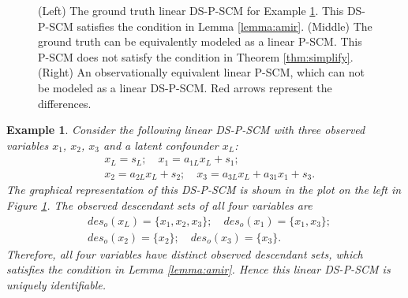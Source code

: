 \documentclass[12pt]{article}
\newtheorem{example}{Example}
\begin{document}
\begin{figure}[t]
\begin{tikzpicture}[thick, scale=.37]
\end{tikzpicture}
\caption{(Left) The ground truth linear DS-P-SCM for Example \ref{example_amir}. This DS-P-SCM satisfies the condition in Lemma \ref{lemma:amir}. (Middle) The ground truth can be equivalently modeled as a linear P-SCM. This P-SCM does not satisfy the condition in Theorem \ref{thm:simplify}. (Right) An observationally equivalent linear P-SCM, which can not be modeled as a linear DS-P-SCM. Red arrows represent the differences.}
\label{fig:example_amir}
\end{figure}

\begin{example} \label{example_amir}
Consider the following linear DS-P-SCM with three observed variables $x_1$, $x_2$, $x_3$ and a latent confounder $x_L$:
\begin{equation}
\begin{aligned}
&x_L = s_L; \quad x_1 = a_{1L}x_L + s_1; \\
&x_2=a_{2L}x_L + s_2;\quad x_3 = a_{3L} x_L + a_{31} x_1 + s_3.
\end{aligned}
\label{eq:example_amir_scm}
\end{equation}
The graphical representation of this DS-P-SCM is shown in the plot on the left in Figure \ref{fig:example_amir}. The observed descendant sets of all four variables are
\begin{align}\nonumber
&des_o(x_L)=\{x_1, x_2, x_3\}; \quad des_o(x_1)=\{x_1, x_3\}; \\
&des_o(x_2)=\{x_2\}; \quad des_o(x_3)=\{x_3\}. \nonumber
\end{align}
Therefore, all four variables have distinct observed descendant sets, which satisfies the condition in Lemma \ref{lemma:amir}. Hence this linear DS-P-SCM is uniquely identifiable.


\end{example}
\end{document}
